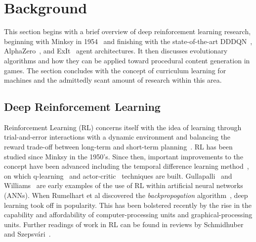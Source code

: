 \documentclass[letterpaper]{article} %
\begin{document}
\section{Background}\label{sec:background}
This section begins with a brief overview of deep reinforcement learning research, beginning with Minksy in 1954~\cite{minsky1954theory} and finishing with the state-of-the-art DDDQN~\cite{wang2016dueling}, AlphaZero~\cite{silver2017mastering,silver2017masteringchess}, and ExIt~\cite{anthony2017thinking} agent architectures. It then discusses evolutionary algorithms and how they can be applied toward procedural content generation in games. The section concludes with the concept of curriculum learning for machines and the admittedly scant amount of research within this area.

\subsection{Deep Reinforcement Learning}
Reinforcement Learning (RL) concerns itself with the idea of learning through trial-and-error interactions with a dynamic environment and balancing the reward trade-off between long-term and short-term planning~\cite{sutton1998introduction}. 
RL has been studied since Minksy \cite{minsky1954theory} in the 1950's. 
Since then, important improvements to the concept have been advanced including the temporal difference learning method~\cite{sutton1984temporal,sutton1988learning}, on which q-learning~\cite{watkins1992q} and actor-critic~\cite{barto1983neuronlike} techniques are built. 
Gullapalli~\cite{gullapalli1990stochastic} and Williams~\cite{williams1992simple} are early examples of the use of RL within artificial neural networks (ANNs). 
When Rumelhart et al discovered the \emph{backpropogation} 
algorithm~\cite{rumelhart1986learning}, deep learning took off in popularity. This has been bolstered recently by the rise in the capability and affordability of computer-processing units and graphical-processing units. 
Further readings of work in RL can be found in reviews by Schmidhuber~\cite{schmidhuber2015deep} and Szepsv\'ari~\cite{szepesvari2010algorithms}.
\end{document}
